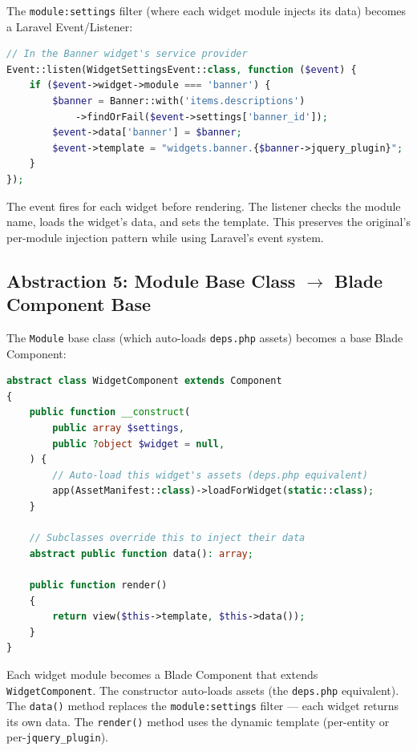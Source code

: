 \documentclass[11pt,a4paper]{article}
\begin{document}
\begin{keybox}
The \texttt{module:settings} filter (where each widget module injects
its data) becomes a Laravel Event/Listener:

\begin{lstlisting}[language=PHP,basicstyle=\ttfamily\small,numbers=none,frame=none]
// In the Banner widget's service provider
Event::listen(WidgetSettingsEvent::class, function ($event) {
    if ($event->widget->module === 'banner') {
        $banner = Banner::with('items.descriptions')
            ->findOrFail($event->settings['banner_id']);
        $event->data['banner'] = $banner;
        $event->template = "widgets.banner.{$banner->jquery_plugin}";
    }
});
\end{lstlisting}

The event fires for each widget before rendering. The listener
checks the module name, loads the widget's data, and sets the
template. This preserves the original's per-module injection pattern
while using Laravel's event system.
\end{keybox}

\subsection{Abstraction 5: Module Base Class $\to$ Blade Component Base}

\begin{keybox}
The \texttt{Module} base class (which auto-loads \texttt{deps.php}
assets) becomes a base Blade Component:

\begin{lstlisting}[language=PHP,basicstyle=\ttfamily\small,numbers=none,frame=none]
abstract class WidgetComponent extends Component
{
    public function __construct(
        public array $settings,
        public ?object $widget = null,
    ) {
        // Auto-load this widget's assets (deps.php equivalent)
        app(AssetManifest::class)->loadForWidget(static::class);
    }

    // Subclasses override this to inject their data
    abstract public function data(): array;

    public function render()
    {
        return view($this->template, $this->data());
    }
}
\end{lstlisting}

Each widget module becomes a Blade Component that extends
\texttt{WidgetComponent}. The constructor auto-loads assets (the
\texttt{deps.php} equivalent). The \texttt{data()} method replaces
the \texttt{module:settings} filter --- each widget returns its own
data. The \texttt{render()} method uses the dynamic template
(per-entity or per-\texttt{jquery\_plugin}).
\end{keybox}
\end{document}

